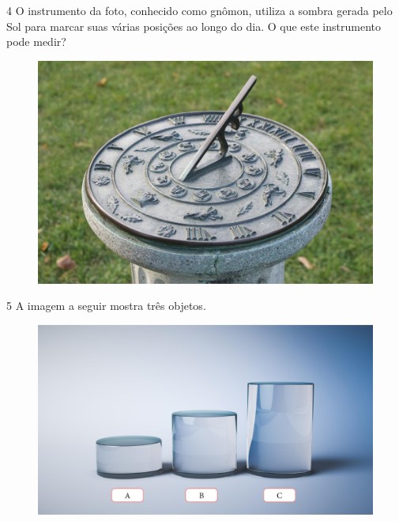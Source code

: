 
\num{4} O instrumento da foto, conhecido como gnômon, utiliza a sombra
gerada pelo Sol para marcar suas várias posições ao longo do dia. O
que este instrumento pode medir?


\begin{figure}[htpb!]
\centering
\includegraphics[width=.5\textwidth]{./media/image33.png}
\end{figure}


\pagebreak
\num{5} A imagem a seguir mostra três objetos.


\begin{figure}[htpb!]
\centering
\includegraphics[width=.6\textwidth]{./media/image34.png}
\end{figure}

